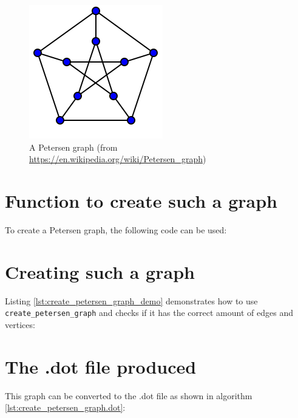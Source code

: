 \begin{figure}[!htbp]
  \includegraphics[]{Petersen_graph.png}
  \caption{
    A Petersen graph 
    (from \url{https://en.wikipedia.org/wiki/Petersen_graph}) 
  }
  \label{fig:create_petersen_graph}
\end{figure}

\section{Function to create such a graph}

To create a Petersen graph, the following code can be used:



\section{Creating such a graph}

Listing \ref{lst:create_petersen_graph_demo}
demonstrates how to use \verb;create_petersen_graph; and checks if it has the
correct amount of edges and vertices:



\section{The .dot file produced}
\label{subsec:create_petersen_graph.dot}

This graph can be converted to the .dot file as shown in algorithm 
\ref{lst:create_petersen_graph.dot}:



